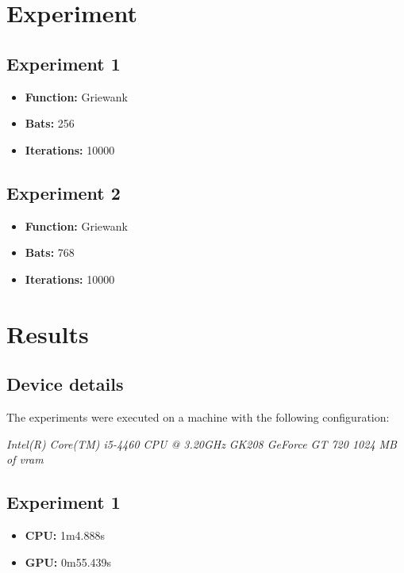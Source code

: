 \documentclass[conference]{IEEEtran}
\begin{document}
\section{Experiment}

\subsection{Experiment 1}

\begin{itemize}
\item \textbf{Function:} Griewank
\item \textbf{Bats:} 256
\item \textbf{Iterations:} 10000
\end{itemize}


\subsection{Experiment 2}

\begin{itemize}
\item \textbf{Function:} Griewank
\item \textbf{Bats:} 768
\item \textbf{Iterations:} 10000
\end{itemize}

\section{Results}

\subsection{Device details}

The experiments were executed on a machine with the following configuration:

\textit{Intel(R) Core(TM) i5-4460  CPU @ 3.20GHz}
\textit{GK208 GeForce GT 720 1024 MB of vram}

\subsection{Experiment 1}

\begin{itemize}
    \item \textbf{CPU:} 1m4.888s
    \item \textbf{GPU:} 0m55.439s
\end{itemize}
\end{document}
